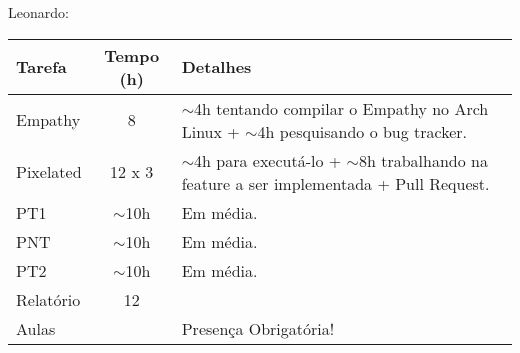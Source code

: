 Leonardo:
\begin{center}
    \begin{tabular}{ | l | c | p{7cm} |}
    \hline
    Tarefa & Tempo (h) & Detalhes \\ \hline
    Empathy & 8 & $\sim$4h tentando compilar o Empathy no Arch Linux + $\sim$4h pesquisando o bug tracker. \\ \hline
    Pixelated & 12 x 3 & $\sim$4h para executá-lo + $\sim$8h trabalhando na feature a ser implementada + Pull Request. \\ \hline
    PT1 & $\sim$10h & Em média. \\ \hline
    PNT & $\sim$10h & Em média. \\ \hline
    PT2 & $\sim$10h & Em média. \\ \hline
    Relatório & 12 &  \\ \hline
    Aulas & & Presença Obrigatória! \\ \hline
    \end{tabular}
\end{center}
